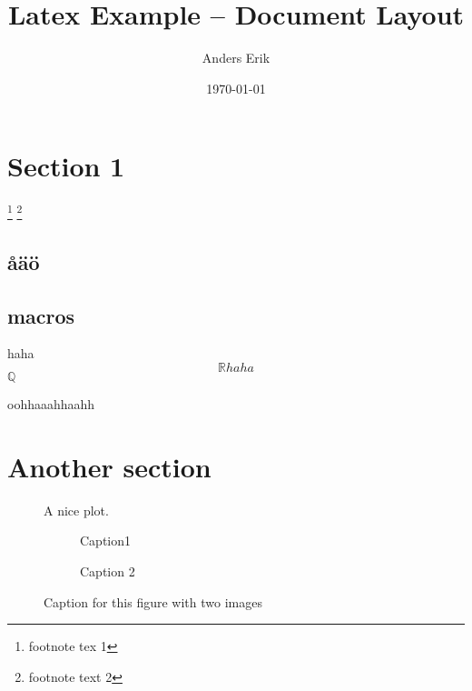 \documentclass[12pt, letterpaper]{article}
\title{Latex Example -- Document Layout}
\author{Anders Erik}
\date{\today}
\begin{document}
\maketitle


\section{Section 1}

\footnote [1] { footnote tex 1 } 
\footnote [4] { footnote text 2 } 


\subsection{\aa\"a\"o}

\subsection{macros}
\def\lol{haha}
\lol
\newcommand{\R}{\mathbb{R}}
\[ \R \lol \]
\newcommand{\bb}[1]{\mathbb{#1}}
\( \bb{Q} \)

\newcommand{\apa}{oohhaaahhaahh}
\apa

\section{Another section}


\begin{figure}[H]
    \centering
    \caption{A nice plot.}
    \label{fig:mesh1}
\end{figure}


\begin{figure}[H]

\begin{subfigure}{0.1\textwidth}
\caption{Caption1}
\label{fig:subim1}
\end{subfigure}

\begin{subfigure}{0.4\textwidth}
\caption{Caption 2}
\label{fig:subim2}
\end{subfigure}

\caption{Caption for this figure with two images}
\label{fig:image2}

\end{figure}
\end{document}

